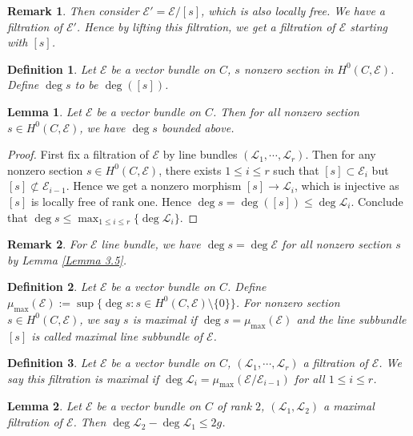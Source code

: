 \documentclass{ctexart}
\newtheorem{definition}{Definition}[section]
\newtheorem{remark}{Remark}[section]
\newtheorem{lemma}{Lemma}[section]
\begin{document}
\begin{remark}
    Then consider $\mathcal{E}' = \mathcal{E}/[s]$, which is also locally free.
    We have a filtration of $\mathcal{E}'$.
    Hence by lifting this filtration, we get a filtration of $\mathcal{E}$ starting with $[s]$.
\end{remark}
\begin{definition}
    Let $\mathcal{E}$ be a vector bundle on $C$, $s$ nonzero section in $H^{0}(C, \mathcal{E})$.
    Define $\deg s$ to be $\deg ([s])$.
\end{definition}
\begin{lemma}
    Let $\mathcal{E}$ be a vector bundle on $C$.
    Then for all nonzero section $s\in H^{0}(C, \mathcal{E})$, we have $\deg s$ bounded above.
    \label{Lemma 5.3}
\end{lemma}
\begin{proof}
    First fix a filtration of $\mathcal{E}$ by line bundles $(\mathcal{L}_{1}, \cdots, \mathcal{L}_{r})$.
    Then for any nonzero section $s\in H^{0}(C, \mathcal{E})$, there exists $1 \le i \le r$ such that $[s] \subset \mathcal{E}_{i}$ but $[s] \not\subset \mathcal{E}_{i - 1}$.
    Hence we get a nonzero morphism $[s] \rightarrow \mathcal{L}_{i}$, which is injective as $[s]$ is locally free of rank one.
    Hence $\deg s = \deg ([s]) \le \deg \mathcal{L}_{i}$.
    Conclude that $\deg s \le \max_{1 \le i \le r} \{\deg \mathcal{L}_{i}\}$.
\end{proof}
\begin{remark}
    For $\mathcal{E}$ line bundle, we have $\deg s = \deg \mathcal{E}$ for all nonzero section $s$ by Lemma \ref{Lemma 3.5}.
\end{remark}
\begin{definition}
    Let $\mathcal{E}$ be a vector bundle on $C$.
    Define $\mu_{\max}(\mathcal{E}) := \sup \{\deg s : s\in H^{0}(C, \mathcal{E}) \setminus \{0\}\}$.
    For nonzero section $s\in H^{0}(C, \mathcal{E})$, we say $s$ is maximal if $\deg s = \mu_{\max}(\mathcal{E})$ and the line subbundle $[s]$ is called maximal line subbundle of $\mathcal{E}$.
\end{definition}
\begin{definition}
    Let $\mathcal{E}$ be a vector bundle on $C$, $(\mathcal{L}_{1}, \cdots, \mathcal{L}_{r})$ a filtration of $\mathcal{E}$.
    We say this filtration is maximal if $\deg \mathcal{L}_{i} = \mu_{\max}(\mathcal{E}/\mathcal{E}_{i - 1})$ for all $1 \le i \le r$.
\end{definition}
\begin{lemma}
    Let $\mathcal{E}$ be a vector bundle on $C$ of rank $2$, $(\mathcal{L}_{1}, \mathcal{L}_{2})$ a maximal filtration of $\mathcal{E}$.
    Then $\deg \mathcal{L}_{2} - \deg \mathcal{L}_{1} \le 2g$.
    \label{Lemma 5.4}
\end{lemma}
\end{document}

